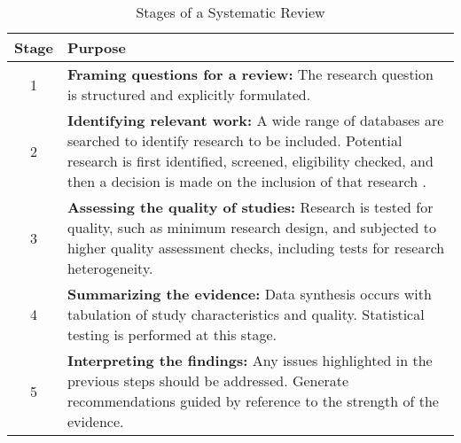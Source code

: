 \begin{table*}[t]
\centering
\small
\begin{tabular}{|c|p{}|}
\hline
\textbf{Stage} & \textbf{Purpose} \\
\hline
1 & \textbf{Framing questions for a review:} The research question is structured and explicitly formulated. \\\hline
2 & \textbf{Identifying relevant work:} A wide range of databases are searched to identify research to be included. Potential research is first identified, screened, eligibility checked, and then a decision is made on the inclusion of that research \cite{tawfik_step_2019}. \\\hline
3 & \textbf{Assessing the quality of studies:} Research is tested for quality, such as minimum research design, and subjected to higher quality assessment checks, including tests for research heterogeneity. \\\hline
4 & \textbf{Summarizing the evidence:} Data synthesis occurs with tabulation of study characteristics and quality. Statistical testing is performed at this stage. \\\hline
5 & \textbf{Interpreting the findings:} Any issues highlighted in the previous steps should be addressed. Generate recommendations guided by reference to the strength of the evidence. \\
\hline
\end{tabular}
\caption{Stages of a Systematic Review}
\label{tab:stages_of_sr}
\end{table*}